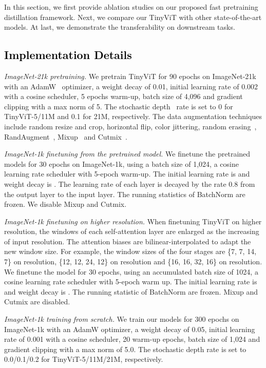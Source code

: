 \documentclass[runningheads]{llncs}
\begin{document}
In this section, we first provide ablation studies on our proposed fast pretraining distillation framework. Next, we compare our TinyViT with other state-of-the-art models. At last, we demonstrate the transferability on downstream tasks.


\vspace{-4mm}
\subsection{\textcolor{black}{Implementation Details}}
\textit{ImageNet-21k pretraining.}
We pretrain TinyViT for 90 epochs on ImageNet-21k~\cite{imagenet} with an AdamW~\cite{adamw} optimizer, a weight decay of 0.01, initial learning rate of 0.002 with a cosine scheduler, 5 epochs warm-up, batch size of 4,096 and gradient clipping with a max norm of 5. The stochastic depth~\cite{stochastic_depth} rate is set to 0 for TinyViT-5/11M and 0.1 for 21M, respectively.
The data augmentation techniques include random resize and crop, horizontal flip, color jittering, random erasing~\cite{random_erase}, RandAugment~\cite{randaug}, Mixup~\cite{mixup} and Cutmix~\cite{cutmix}.

\textit{ImageNet-1k finetuning from the pretrained model.}
We finetune the pretrained models for 30 epochs on ImageNet-1k, using a batch size of 1,024, a cosine learning rate scheduler with 5-epoch warm-up. The initial learning rate is  and weight decay is . The learning rate of each layer is decayed by the rate 0.8 from the output layer to the input layer. The running statistics of BatchNorm are frozen. We disable Mixup and Cutmix.

\textit{ImageNet-1k finetuning on higher resolution.} When finetuning TinyViT on higher resolution, the windows of each self-attention layer are enlarged as the increasing of input resolution. The attention biases are bilinear-interpolated to adapt the new window size. For example, the window sizes of the four stages are \{7, 7, 14, 7\} on  resolution, \{12, 12, 24, 12\} on  resolution and \{16, 16, 32, 16\} on  resolution.
We finetune the model for 30 epochs, using an accumulated batch size of 1024, a cosine learning rate scheduler with 5-epoch warm up. The initial learning rate is  and weight decay is . The running statistic of BatchNorm are frozen. Mixup and Cutmix are disabled.

\textit{ImageNet-1k training from scratch.}
We train our models for 300 epochs on ImageNet-1k with an AdamW optimizer, a weight decay of 0.05, initial learning rate of 0.001 with a cosine scheduler, 20 warm-up epochs, batch size of 1,024 and gradient clipping with a max norm of 5.0.
The stochastic depth rate is set to 0.0/0.1/0.2 for TinyViT-5/11M/21M, respectively.
\end{document}
